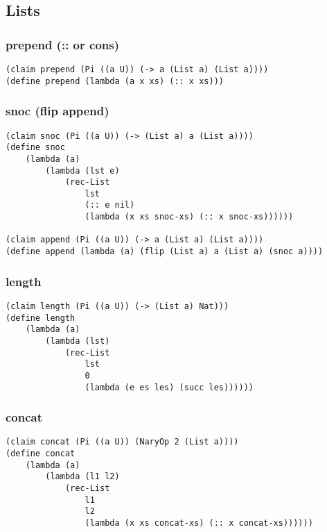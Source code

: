 \subsection{Lists}

\subsubsection{prepend (:: or cons)} \label{code:prepend}
\begin{verbatim}
(claim prepend (Pi ((a U)) (-> a (List a) (List a))))
(define prepend (lambda (a x xs) (:: x xs)))
\end{verbatim}

\subsubsection{snoc (flip append)} \label{code:snoc}
\begin{verbatim}
(claim snoc (Pi ((a U)) (-> (List a) a (List a))))
(define snoc
    (lambda (a)
        (lambda (lst e)
            (rec-List
                lst
                (:: e nil)
                (lambda (x xs snoc-xs) (:: x snoc-xs))))))

(claim append (Pi ((a U)) (-> a (List a) (List a))))
(define append (lambda (a) (flip (List a) a (List a) (snoc a))))
\end{verbatim}


\subsubsection{length} \label{code:length}
\begin{verbatim}
(claim length (Pi ((a U)) (-> (List a) Nat)))
(define length
    (lambda (a)
        (lambda (lst)
            (rec-List
                lst
                0
                (lambda (e es les) (succ les))))))
\end{verbatim}

\subsubsection{concat} \label{code:concat}
\begin{verbatim}
(claim concat (Pi ((a U)) (NaryOp 2 (List a))))
(define concat
    (lambda (a)
        (lambda (l1 l2)
            (rec-List
                l1
                l2
                (lambda (x xs concat-xs) (:: x concat-xs))))))
\end{verbatim}

